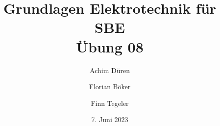 \documentclass[../../document.tex]{subfiles}
\begin{document}
\title{Grundlagen Elektrotechnik für SBE\\Übung 08}

\author{
  Achim Düren\\
  \and
  Florian Böker\\
  \and
  Finn Tegeler
}
\date{7. Juni 2023}

\maketitle
\end{document}
